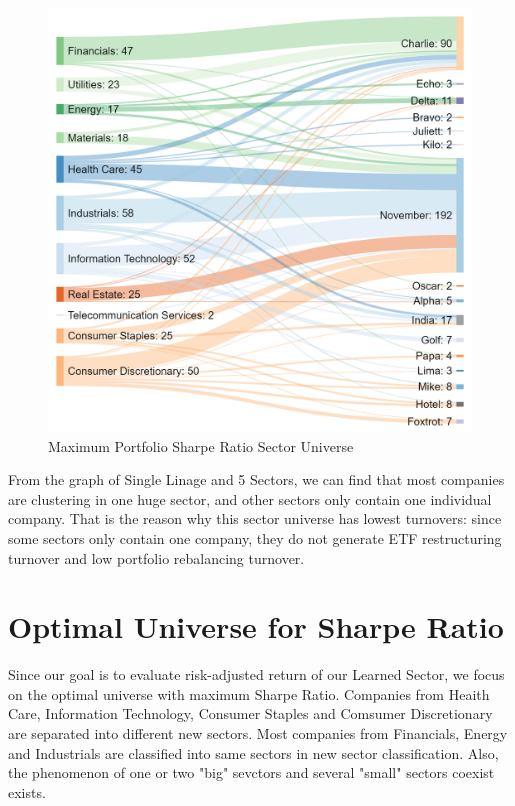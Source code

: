 \documentclass[../main.tex]{subfiles}
\begin{document}
\begin{figure}[H]
    \centering
    \includegraphics[scale=0.2]{images/complete_2017_16.png}
    \caption{Maximum Portfolio Sharpe Ratio Sector Universe}
    \label{fig:optimal_sector_universes:max_sharpe}
\end{figure}

From the graph of Single Linage and  5 Sectors, we can find that most companies are clustering in one huge sector, and other sectors only contain one individual company. That is the reason why this sector universe has lowest turnovers: since some sectors only contain one company, they do not generate ETF restructuring turnover and low portfolio rebalancing turnover. 

\section{Optimal Universe for Sharpe Ratio}

Since our goal is to evaluate risk-adjusted return of our Learned Sector, we focus on the optimal universe with maximum Sharpe Ratio. Companies from Heaith Care, Information Technology, Consumer Staples and Comsumer Discretionary are separated into different new sectors. Most companies from Financials, Energy and Industrials are classified into same sectors in new sector classification. Also, the phenomenon of one or two "big" sevctors and several "small" sectors coexist exists. 
\end{document}

